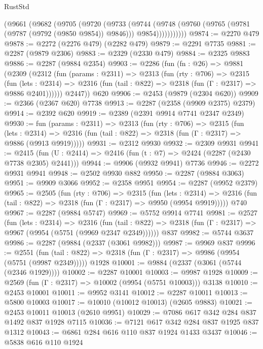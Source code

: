 \begin{lexlean}{RustStd}
\begin{coremodule}
          (@9661
            (@9682
              (@9705
                (@9720
                  (@9733
                    (@9744
                      (@9748
                        (@9760 (@9765 (@9781 (@9787 (@9792 (@9850 @9854)) @9846))) @9854)))))))))))
@9874 := @2270 @479
@9878 := @2272 (@2276 @479) (@2282 @479)
@9879 := @2291 @7735
@9881 := @2287 (@9879 @2306)
@9883 := @2329 (@2330 @479)
@9884 := @2325 @9883
@9886 := @2287 (@9884 @2354)
@9903 := @2286
    (fun (fn : @26) =>
    @9881
      (@2309
        (@2312
          (fun (params : @2311) =>
          @2313
            (fun (rty : @706) =>
            @2315
              (fun (lets : @2314) =>
              @2316 (fun (tail : @822) => @2318 (fun (Γ : @2317) => @9886 @2401))))))
        @2447))
    @620
@9906 := @2453 (@9879 (@2304 @620))
@9909 := @2366 (@2367 @620) @7738
@9913 := @2287 (@2358 (@9909 @2375) @2379)
@9914 := @2392 @620
@9919 := @2389 (@2391 @9914 @7741 @2347 @2349)
@9930 := fun (params : @2311) =>
  @2313
    (fun (rty : @706) =>
    @2315
      (fun (lets : @2314) =>
      @2316 (fun (tail : @822) => @2318 (fun (Γ : @2317) => @9886 (@9913 @9919)))))
@9931 := @2312 @9930
@9932 := @2309 @9931
@9941 := @2415 (fun (U : @2414) => @2416 (fun (t : @7) => @2424 (@2287 (@2430 @7738 @2305) @2441)))
@9944 := @9906 (@9932 @9941) @7736
@9946 := @2272 @9931 @9941
@9948 := @2502 @9930 @882
@9950 := @2287 (@9884 @3063)
@9951 := @9909 @3066
@9952 := @2358 @9951
@9954 := @2287 (@9952 @2379)
@9965 := @2505
    (fun (rty : @706) =>
    @2315
      (fun (lets : @2314) =>
      @2316 (fun (tail : @822) => @2318 (fun (Γ : @2317) => @9950 (@9954 @9919)))))
    @740
@9967 := @2287 (@9884 @5747)
@9969 := @5752 @9914 @7741
@9981 := @2527
    (fun (lets : @2314) =>
    @2316
      (fun (tail : @822) => @2318 (fun (Γ : @2317) => @9967 (@9954 (@5751 (@9969 @2347 @2349))))))
    @837
@9982 := @5744 @3637
@9986 := @2287 (@9884 (@2337 (@3061 @9982)))
@9987 := @9969 @837
@9996 := @2551
    (fun (tail : @822) => @2318 (fun (Γ : @2317) => @9986 (@9954 (@5751 (@9987 @2349)))))
    @1928
@10001 := @9884 (@2337 (@3061 (@5744 (@2346 @1929))))
@10002 := @2287 @10001
@10003 := @9987 @1928
@10009 := @2569 (fun (Γ : @2317) => @10002 (@9954 (@5751 @10003))) @3138
@10010 := @2453 @10001
@10011 := @9952 @3141
@10012 := @2287 @10011
@10013 := @5800 @10003
@10017 := @10010 (@10012 @10013) (@2605 @9883)
@10021 := @2453 @10011 @10013 (@2610 @9951)
@10029 := @7086 @617 @342 @284 @837 @1492 @837 @1928 @7115
@10036 := @7121 @617 @342 @284 @837 @1925 @837 @1312
@10043 := @6861 @284 @616 @110 @837 @1924 @1433 @3437
@10046 := @5838 @616 @110 @1924

\end{coremodule}
\end{lexlean}
